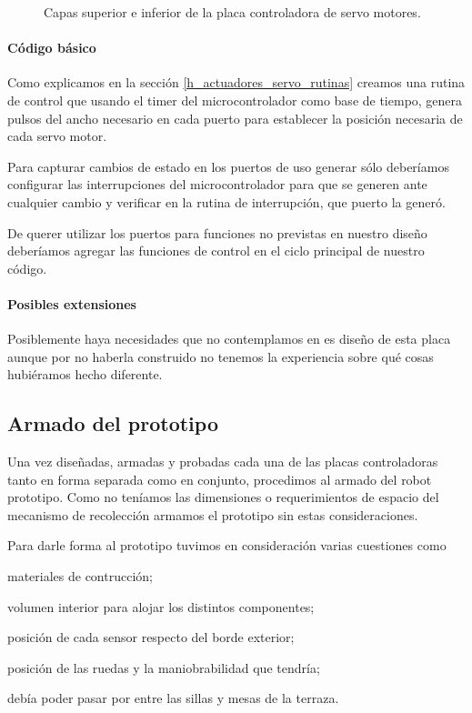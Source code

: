 \begin{figure}
	\caption{Capas superior e inferior de la placa controladora de servo motores.}
	\label{hF_placa_servo_capas}
\end{figure}

\paragraph{C\'odigo b\'asico}
\label{h_placas_servos_codigo}

Como explicamos en la secci\'on \ref{h_actuadores_servo_rutinas} creamos una rutina de control
que usando el timer del microcontrolador como base de tiempo, genera pulsos del ancho necesario
en cada puerto para establecer la posici\'on necesaria de cada servo motor.

Para capturar cambios de estado en los puertos de uso generar s\'olo deber\'iamos configurar las
interrupciones del microcontrolador para que se generen ante cualquier cambio y verificar en la
rutina de interrupci\'on, que puerto la gener\'o.

De querer utilizar los puertos para funciones no previstas en nuestro dise\~no deber\'iamos
agregar las funciones de control en el ciclo principal de nuestro c\'odigo.

\paragraph{Posibles extensiones}
\label{h_placas_servos_extensiones}

Posiblemente haya necesidades que no contemplamos en es dise\~no de esta placa aunque por no
haberla construido no tenemos la experiencia sobre qu\'e cosas hubi\'eramos hecho diferente.

\subsection{Armado del prototipo}
\label{h_prototipo}

Una vez dise\~nadas, armadas y probadas cada una de las placas controladoras tanto en forma separada
como en conjunto, procedimos al armado del robot prototipo.
Como no ten\'iamos las dimensiones o requerimientos de espacio del mecanismo de recolecci\'on
armamos el prototipo sin estas consideraciones.

Para darle forma al prototipo tuvimos en consideraci\'on varias cuestiones como
\begin{inparaenum}
\item materiales de contrucci\'on;
\item volumen interior para alojar los distintos componentes;
\item posici\'on de cada sensor respecto del borde exterior;
\item posici\'on de las ruedas y la maniobrabilidad que tendr\'ia;
\item deb\'ia poder pasar por entre las sillas y mesas de la terraza.
\end{inparaenum}

